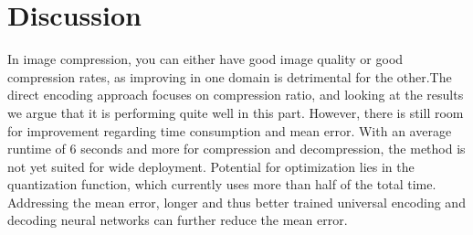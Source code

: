 \section{Discussion} \label{sec:discussion}
In image compression, you can either have good image quality or good compression rates, as improving in one domain is detrimental for the other.\newpage The direct encoding approach focuses on compression ratio, and looking at the results we argue that it is performing quite well in this part. However, there is still room for improvement regarding time consumption and mean error. With an average runtime of 6 seconds and more for compression and decompression, the method is not yet suited for wide deployment. Potential for optimization lies in the quantization function, which currently uses more than half of the total time. Addressing the mean error, longer and thus better trained universal encoding and decoding neural networks can further reduce the mean error. 




